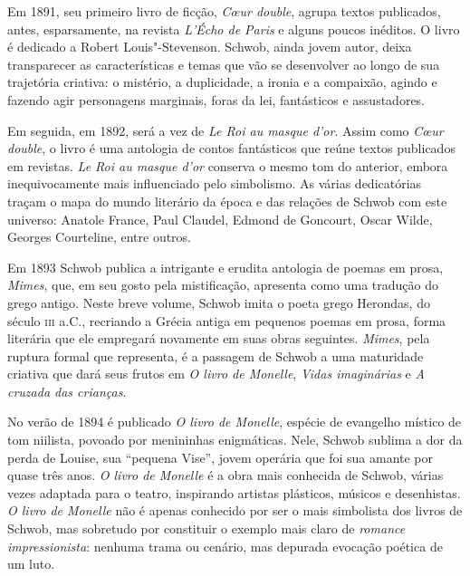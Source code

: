Em 1891, seu primeiro livro de ficção, \textit{C\oe ur double}, agrupa textos
publicados, antes, esparsamente, na revista \textit{L’Écho de Paris} e
alguns poucos inéditos. O livro é dedicado a Robert Louis"-Stevenson. Schwob,
ainda jovem autor, deixa transparecer as características e temas que vão se
desenvolver ao longo de sua trajetória criativa: o mistério, a duplicidade, a
ironia e a compaixão, agindo e fazendo agir personagens marginais, foras da
lei, fantásticos e assustadores.

Em seguida, em 1892, será a vez de \textit{Le Roi au masque d’or}. Assim
como \textit{C\oe ur double}, o livro é uma antologia de contos fantásticos que
reúne textos publicados em revistas. \textit{Le Roi
au masque d’or} conserva o mesmo tom do anterior, embora inequivocamente mais
influenciado pelo simbolismo. As várias dedicatórias traçam o mapa do mundo
literário da época e das relações de Schwob com este universo: Anatole France,
Paul Claudel, Edmond de Goncourt, Oscar Wilde, Georges Courteline, entre outros.

Em 1893 Schwob publica a intrigante e erudita antologia de poemas em prosa,
\textit{Mimes}, que, em seu gosto pela mistificação, apresenta como uma
tradução do grego antigo. Neste breve volume, Schwob imita o poeta grego
Herondas, do século \textsc{iii} a.C., recriando a Grécia antiga em pequenos poemas em
prosa, forma literária que ele empregará novamente em suas obras seguintes.
\textit{Mimes}, pela ruptura formal que representa, é a passagem de Schwob a uma 
maturidade criativa que
dará seus frutos em \textit{O livro de Monelle}, \textit{Vidas imaginárias} e 
\textit{A cruzada das crianças}.

No verão de 1894 é publicado \textit{O livro de Monelle},
espécie de evangelho místico de tom niilista, povoado por menininhas
enigmáticas. Nele, Schwob sublima a dor da perda de Louise, sua
“pequena Vise”, jovem operária que foi sua amante por quase três anos.
\textit{O livro de Monelle} é a obra mais conhecida de Schwob, várias vezes
adaptada para o teatro, inspirando artistas plásticos, músicos e desenhistas.
\textit{O livro de Monelle} não é apenas conhecido por ser o mais simbolista
dos livros de Schwob, mas sobretudo por constituir o exemplo mais claro de
\textit{romance impressionista}: nenhuma trama ou cenário, mas depurada
evocação poética de um luto.

